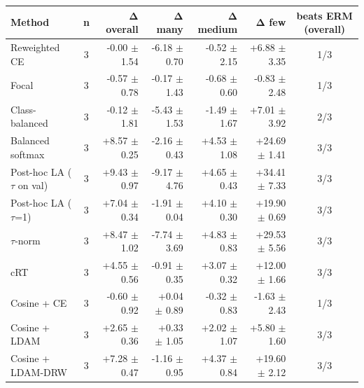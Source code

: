 \begin{tabular}{lcrrrrc}
\toprule
Method & n & Δ overall & Δ many & Δ medium & Δ few & beats ERM (overall) \\
\midrule
Reweighted CE & 3 & -0.00 $\pm$ 1.54 & -6.18 $\pm$ 0.70 & -0.52 $\pm$ 2.15 & +6.88 $\pm$ 3.35 & 1/3 \\
Focal & 3 & -0.57 $\pm$ 0.78 & -0.17 $\pm$ 1.43 & -0.68 $\pm$ 0.60 & -0.83 $\pm$ 2.48 & 1/3 \\
Class-balanced & 3 & -0.12 $\pm$ 1.81 & -5.43 $\pm$ 1.53 & -1.49 $\pm$ 1.67 & +7.01 $\pm$ 3.92 & 2/3 \\
Balanced softmax & 3 & +8.57 $\pm$ 0.25 & -2.16 $\pm$ 0.43 & +4.53 $\pm$ 1.08 & +24.69 $\pm$ 1.41 & 3/3 \\
Post-hoc LA ($\tau$ on val) & 3 & +9.43 $\pm$ 0.97 & -9.17 $\pm$ 4.76 & +4.65 $\pm$ 0.43 & +34.41 $\pm$ 7.33 & 3/3 \\
Post-hoc LA ($\tau$=1) & 3 & +7.04 $\pm$ 0.34 & -1.91 $\pm$ 0.04 & +4.10 $\pm$ 0.30 & +19.90 $\pm$ 0.69 & 3/3 \\
$\tau$-norm & 3 & +8.47 $\pm$ 1.02 & -7.74 $\pm$ 3.69 & +4.83 $\pm$ 0.83 & +29.53 $\pm$ 5.56 & 3/3 \\
cRT & 3 & +4.55 $\pm$ 0.56 & -0.91 $\pm$ 0.35 & +3.07 $\pm$ 0.32 & +12.00 $\pm$ 1.66 & 3/3 \\
Cosine + CE & 3 & -0.60 $\pm$ 0.92 & +0.04 $\pm$ 0.89 & -0.32 $\pm$ 0.83 & -1.63 $\pm$ 2.43 & 1/3 \\
Cosine + LDAM & 3 & +2.65 $\pm$ 0.36 & +0.33 $\pm$ 1.05 & +2.02 $\pm$ 1.07 & +5.80 $\pm$ 1.60 & 3/3 \\
Cosine + LDAM-DRW & 3 & +7.28 $\pm$ 0.47 & -1.16 $\pm$ 0.95 & +4.37 $\pm$ 0.84 & +19.60 $\pm$ 2.12 & 3/3 \\
\bottomrule
\end{tabular}